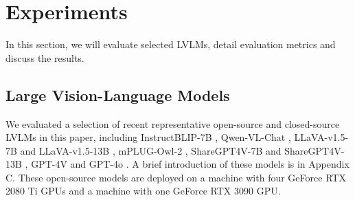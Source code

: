 \section{Experiments}
\label{sec:experiments}

In this section, we will evaluate selected LVLMs, detail evaluation metrics and
discuss the results. 

\subsection{Large Vision-Language Models}
\label{sec:lvlm}

We evaluated a selection of recent representative open-source and closed-source LVLMs in this paper, including InstructBLIP-7B \cite{dai2023instructblip}, Qwen-VL-Chat \cite{bai2023qwenvl}, LLaVA-v1.5-7B and LLaVA-v1.5-13B \cite{liu2023improved}, mPLUG-Owl-2 \cite{ye2023mplug}, ShareGPT4V-7B and ShareGPT4V-13B \cite{chen2023sharegpt4v}, GPT-4V and GPT-4o \cite{openai2023gpt4}. 
A brief introduction of these models is in Appendix C. %
These open-source models are deployed on a machine with four GeForce RTX 2080 Ti GPUs and a machine with one GeForce RTX 3090 GPU.



